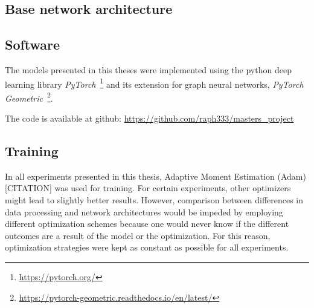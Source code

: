 
\subsection{Base network architecture}


\subsection{Software}

The models presented in this theses were implemented using the python deep learning library \textit{PyTorch}~\footnote{\url{https://pytorch.org/}} and its extension for graph neural networks, \textit{PyTorch Geometric}~\footnote{\url{https://pytorch-geometric.readthedocs.io/en/latest/}}.

The code is available at github: \url{https://github.com/raph333/masters_project}



\subsection{Training}
\label{sec:training}

In all experiments presented in this thesis, Adaptive Moment Estimation (Adam)[CITATION] was used for training. For certain experiments, other optimizers might lead to slightly better results. However, comparison between differences in data processing and network architectures would be impeded by employing different optimization schemes because one would never know if the different outcomes are a result of the model or the optimization. For this reason, optimization strategies were kept as constant as possible for all experiments.

